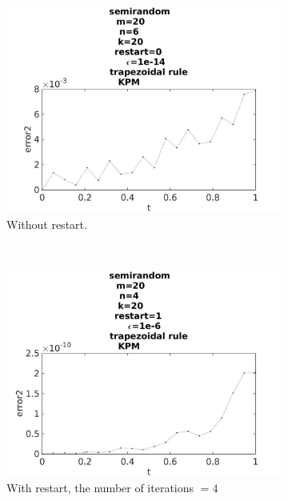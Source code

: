 \begin{figure}[H]
        \begin{subfigure}[b]{0.3\textwidth}
                \includegraphics[width=\textwidth]{../MATLAB/fig/errorarnrestart0.jpg}
                \caption{  Without restart. }
                \label{fig:energyarnrestart0}
        \end{subfigure}%
        ~
        \begin{subfigure}[b]{0.3\textwidth}
                \includegraphics[width=\textwidth]{../MATLAB/fig/errorarnrestart2.jpg}
                \caption{ With restart, the number of iterations $ = 4$ }
                \label{fig:energyarnrestart2}
        \end{subfigure}
        ~
        \begin{subfigure}[b]{0.3\textwidth}

\end{subfigure}
\end{figure}
